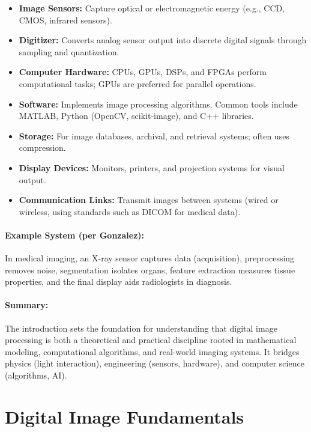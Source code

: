 \documentclass[12pt,a4paper]{AnantDocumentation}
\begin{document}
\begin{itemize}
\item \textbf{Image Sensors:} Capture optical or electromagnetic energy (e.g., CCD, CMOS, infrared sensors).
\item \textbf{Digitizer:} Converts analog sensor output into discrete digital signals through sampling and quantization.
\item \textbf{Computer Hardware:} CPUs, GPUs, DSPs, and FPGAs perform computational tasks; GPUs are preferred for parallel operations.
\item \textbf{Software:} Implements image processing algorithms. Common tools include MATLAB, Python (OpenCV, scikit-image), and C++ libraries.
\item \textbf{Storage:} For image databases, archival, and retrieval systems; often uses compression.
\item \textbf{Display Devices:} Monitors, printers, and projection systems for visual output.
\item \textbf{Communication Links:} Transmit images between systems (wired or wireless, using standards such as DICOM for medical data).
\end{itemize}

\paragraph{Example System (per Gonzalez):} In medical imaging, an X-ray sensor captures data (acquisition), preprocessing removes noise, segmentation isolates organs, feature extraction measures tissue properties, and the final display aids radiologists in diagnosis.

\paragraph{Summary:} The introduction sets the foundation for understanding that digital image processing is both a theoretical and practical discipline rooted in mathematical modeling, computational algorithms, and real-world imaging systems. It bridges physics (light interaction), engineering (sensors, hardware), and computer science (algorithms, AI).

\section{Digital Image Fundamentals}
\end{document}

